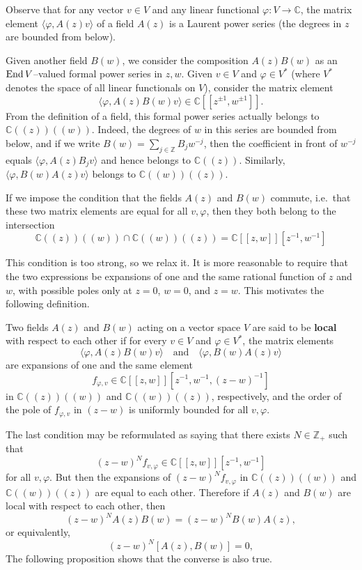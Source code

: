 \documentclass[12pt]{article}
\begin{document}
Observe that for any vector $v \in V$ and any linear functional $\varphi : V \to \mathbb{C}$, the matrix element $\langle \varphi, A(z)v \rangle$ of a field $A(z)$ is a Laurent power series (the degrees in $z$ are bounded from below).

Given another field $B(w)$, we consider the composition $A(z)B(w)$ as an $\operatorname{End} V$–valued formal power series in $z,w$.
Given $v \in V$ and $\varphi \in V^*$ (where $V^*$ denotes the space of all linear functionals on $V$), consider the matrix element
\[
    \langle \varphi, A(z)B(w)v \rangle \in \mathbb{C}[[z^{\pm1}, w^{\pm1}]].
\]
From the definition of a field, this formal power series actually belongs to $\mathbb{C}((z))((w))$.
Indeed, the degrees of $w$ in this series are bounded from below, and if we write $B(w) = \sum_{j \in \mathbb{Z}} B_j w^{-j}$, then the coefficient in front of $w^{-j}$ equals $\langle \varphi, A(z)B_j v\rangle$ and hence belongs to $\mathbb{C}((z))$.
Similarly, $\langle \varphi, B(w)A(z)v\rangle$ belongs to $\mathbb{C}((w))((z))$.

If we impose the condition that the fields $A(z)$ and $B(w)$ commute, i.e.\ that these two matrix elements are equal for all $v,\varphi$, then they both belong to the intersection \[\mathbb{C}((z))((w)) \cap \mathbb{C}((w))((z)) = \mathbb{C}[[z,w]][z^{-1},w^{-1}]\]

This condition is too strong, so we relax it.
It is more reasonable to require that the two expressions be expansions of one and the same rational function of $z$ and $w$, with possible poles only at $z=0$, $w=0$, and $z=w$.
This motivates the following definition.

\begin{definition}
    Two fields $A(z)$ and $B(w)$ acting on a vector space $V$ are said to be \textbf{local} with respect to each other if for every $v \in V$ and $\varphi \in V^*$, the matrix elements
    \[
        \langle \varphi, A(z)B(w)v \rangle \quad \text{and} \quad \langle \varphi, B(w)A(z)v \rangle
    \]
    are expansions of one and the same element
    \[
        f_{\varphi,v} \in \mathbb{C}[[z,w]][z^{-1},w^{-1},(z-w)^{-1}]
    \]
    in $\mathbb{C}((z))((w))$ and $\mathbb{C}((w))((z))$, respectively, and the order of the pole of $f_{\varphi,v}$ in $(z-w)$ is uniformly bounded for all $v,\varphi$.
\end{definition}

The last condition may be reformulated as saying that there exists
$N \in \mathbb{Z}_+$ such that
\[
    (z-w)^N f_{v,\varphi} \in \mathbb{C}[[z,w]][z^{-1},w^{-1}]
\]
for all $v,\varphi$. But then the expansions of $(z-w)^N f_{v,\varphi}$ in
$\mathbb{C}((z))((w))$ and $\mathbb{C}((w))((z))$ are equal to each other.
Therefore if $A(z)$ and $B(w)$ are local with respect to each other, then
\[
    (z-w)^N A(z)B(w) = (z-w)^N B(w)A(z),
\]
or equivalently,
\[
    (z-w)^N [A(z),B(w)] = 0,
\]
The following proposition shows that the converse is also true.
\end{document}
